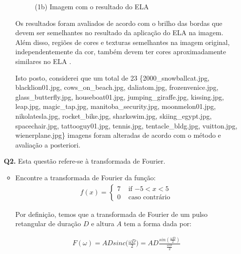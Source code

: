 \documentclass[12pt]{article}
\begin{document}
\begin{itemize}
\begin{itemize}
\begin{figure}[htb]
\begin{minipage}[b]{0.45\textwidth}
	\centerline{\label{fig1b} \small (1b) Imagem com o resultado do ELA}
\end{minipage}
\end{figure}

Os resultados foram avaliados de acordo com o brilho das bordas que devem ser semelhantes no resultado 
da aplicação do ELA na imagem. Além disso, regiões de cores e texturas semelhantes na imagem
original, independentemente da cor, também devem ter cores aproximadamente similares no ELA \cite{berkeleywebsite}.

Isto posto, considerei que um total de 23 \{2000\_snowballcat.jpg, blacklion01.jpg, cows\_on\_beach.jpg, daliatom.jpg,
frozenvenice.jpg, glass\_butterfly.jpg, houseboat01.jpg, jumping\_giraffe.jpg, kissing.jpg, leap.jpg, magic\_tap.jpg,
manitoba\_security.jpg, moonmelon01.jpg, nikolatesla.jpg, rocket\_bike.jpg, sharkswim.jpg, skiing\_egypt.jpg, spacechair.jpg,
tattooguy01.jpg, tennis.jpg, tentacle\_bldg.jpg, vuitton.jpg, wienerplane.jpg\} imagens foram alteradas de acordo 
com o método e avaliação a posteriori.
\end{itemize}
%
%
%
\item[{\bf Q2.}] Esta questão refere-se à transformada de Fourier.
\begin{itemize}
\item Encontre a transformada de Fourier da função:
\begin{eqnarray*}
f(x) = \left\{ \begin{array}{rl} 
 7 &\mbox{ if $-5 < x < 5$} \\
 0 &\mbox{ caso contrário}
       \end{array} \right.
\end{eqnarray*}

Por definição, temos que a transformada de Fourier de um pulso
retangular de duração $D$ e altura $A$ tem a forma dada por:

\begin{eqnarray*}
    F(\omega) = ADsinc\bigg(\frac{\omega D}{2}\bigg)  = AD\frac{sin(\frac{\omega D}{2})}{\frac{\omega D}{2}}
\end{eqnarray*}


\end{itemize}
\end{itemize}
\end{document}
